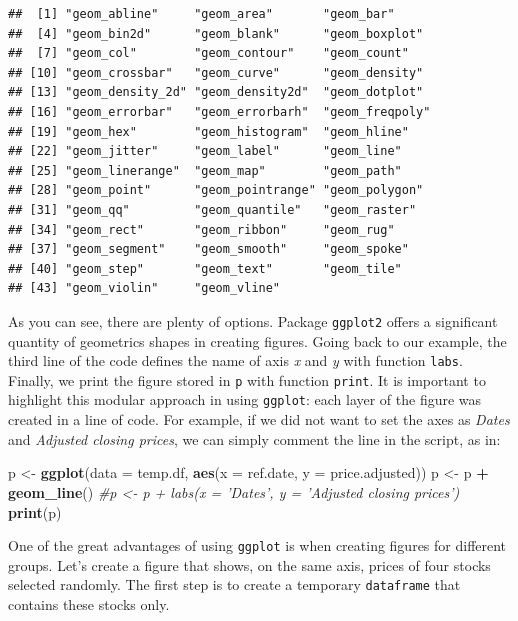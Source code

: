 \documentclass[11pt,]{book}
\newenvironment{Shaded}{\begin{snugshade}}{\end{snugshade}}
\newcommand{\KeywordTok}[1]{\textcolor[rgb]{0.27,0.27,0.27}{\textbf{#1}}}
\newcommand{\DataTypeTok}[1]{\textcolor[rgb]{0.27,0.27,0.27}{#1}}
\newcommand{\StringTok}[1]{\textcolor[rgb]{0.5,0.5,0.5}{#1}}
\newcommand{\CommentTok}[1]{\textcolor[rgb]{0.56,0.35,0.01}{\textit{#1}}}
\newcommand{\OperatorTok}[1]{\textcolor[rgb]{0.81,0.36,0.00}{\textbf{#1}}}
\newcommand{\NormalTok}[1]{#1}
\begin{document}
\begin{verbatim}
##  [1] "geom_abline"     "geom_area"       "geom_bar"       
##  [4] "geom_bin2d"      "geom_blank"      "geom_boxplot"   
##  [7] "geom_col"        "geom_contour"    "geom_count"     
## [10] "geom_crossbar"   "geom_curve"      "geom_density"   
## [13] "geom_density_2d" "geom_density2d"  "geom_dotplot"   
## [16] "geom_errorbar"   "geom_errorbarh"  "geom_freqpoly"  
## [19] "geom_hex"        "geom_histogram"  "geom_hline"     
## [22] "geom_jitter"     "geom_label"      "geom_line"      
## [25] "geom_linerange"  "geom_map"        "geom_path"      
## [28] "geom_point"      "geom_pointrange" "geom_polygon"   
## [31] "geom_qq"         "geom_quantile"   "geom_raster"    
## [34] "geom_rect"       "geom_ribbon"     "geom_rug"       
## [37] "geom_segment"    "geom_smooth"     "geom_spoke"     
## [40] "geom_step"       "geom_text"       "geom_tile"      
## [43] "geom_violin"     "geom_vline"
\end{verbatim}

As you can see, there are plenty of options. Package \texttt{ggplot2}
offers a significant quantity of geometrics shapes in creating figures.
Going back to our example, the third line of the code defines the name
of axis \emph{x} and \emph{y} with function \texttt{labs}. Finally, we
print the figure stored in \texttt{p} with function \texttt{print}. It
is important to highlight this modular approach in using
\texttt{ggplot}: each layer of the figure was created in a line of code.
For example, if we did not want to set the axes as \emph{Dates} and
\emph{Adjusted closing prices}, we can simply comment the line in the
script, as in:

\begin{Shaded}
\begin{Highlighting}[]
\NormalTok{p <-}\StringTok{ }\KeywordTok{ggplot}\NormalTok{(}\DataTypeTok{data =}\NormalTok{ temp.df, }\KeywordTok{aes}\NormalTok{(}\DataTypeTok{x =}\NormalTok{ ref.date, }\DataTypeTok{y =}\NormalTok{ price.adjusted))}
\NormalTok{p <-}\StringTok{ }\NormalTok{p }\OperatorTok{+}\StringTok{ }\KeywordTok{geom_line}\NormalTok{()}
\CommentTok{#p <- p + labs(x = 'Dates', y = 'Adjusted closing prices')}
\KeywordTok{print}\NormalTok{(p)}
\end{Highlighting}
\end{Shaded}

One of the great advantages of using \texttt{ggplot} is when creating
figures for different groups. Let's create a figure that shows, on the
same axis, prices of four stocks selected randomly. The first step is to
create a temporary \texttt{dataframe} that contains these stocks only.
\end{document}
